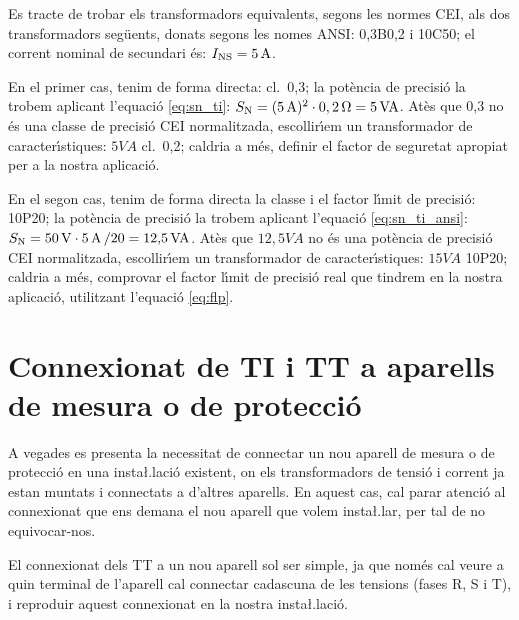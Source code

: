\begin{exemple}
    Es tracte de trobar els transformadors equivalents, segons les normes \textsf{CEI}, als dos
    transformadors seg\"{u}ents, donats segons les nomes \textsf{ANSI}: 0,3B0,2 i
    10C50; el corrent nominal de secundari \'{e}s:    $I_\mathrm{NS}=5\mathrm{\,A}$.

    En el primer cas, tenim de forma directa: cl.~0,3; la pot\`{e}ncia de precisi\'{o} la trobem
    aplicant l'equaci\'{o} \eqref{eq:sn_ti}: $S_\mathrm{N} =(5\mathrm{\,A})^2 \cdot 0,2\mathrm{\,\mathrm{\Omega}} =
    5\mathrm{\,VA}$.
    At\`{e}s que 0,3 no \'{e}s una classe de precisi\'{o} \textsf{CEI} normalitzada,
    escollir\'{\i}em un transformador de caracter\'{\i}stiques:
    $5\unit{VA}$ cl.~0,2; caldria a m\'{e}s, definir el factor de
    seguretat apropiat per a la nostra aplicaci\'{o}.

    En el segon cas, tenim de forma directa la classe i el factor l\'{\i}mit de
    precisi\'{o}: 10P20; la pot\`{e}ncia de precisi\'{o} la trobem
    aplicant l'equaci\'{o} \eqref{eq:sn_ti_ansi}: $S_\mathrm{N} = 50\mathrm{\,V} \cdot
    5\mathrm{\,A}\, / 20 = 12{,}5\mathrm{\,VA}$.
    At\`{e}s que $12{,}5\unit{VA}$ no \'{e}s una pot\`{e}ncia de precisi\'{o} \textsf{CEI} normalitzada,
     escollir\'{\i}em un transformador de caracter\'{\i}stiques:
    $15\unit{VA}$ 10P20; caldria a m\'{e}s, comprovar el factor l\'{\i}mit de precisi\'{o} real
    que tindrem en la nostra aplicaci\'{o}, utilitzant l'equaci\'{o} \eqref{eq:flp}.

\end{exemple}

\section{Connexionat de TI i TT a aparells de mesura o de
protecci\'{o}}\label{sec:conex_ti_tt}

A vegades es presenta la necessitat de connectar un nou aparell de
mesura o de protecci\'{o} en una insta{\l.l}aci\'{o} existent, on els
transformadors de tensi\'{o} i corrent ja estan muntats i connectats a
d'altres aparells. En aquest cas, cal parar atenci\'{o} al connexionat
que ens demana el nou aparell que volem insta{\l.l}ar, per tal de no
equivocar-nos.

El connexionat dels TT a un nou aparell sol ser simple, ja que nom\'{e}s
cal veure a quin terminal de l'aparell cal connectar cadascuna de
les tensions (fases R, S i T), i reproduir aquest connexionat en la
nostra insta{\l.l}aci\'{o}.

